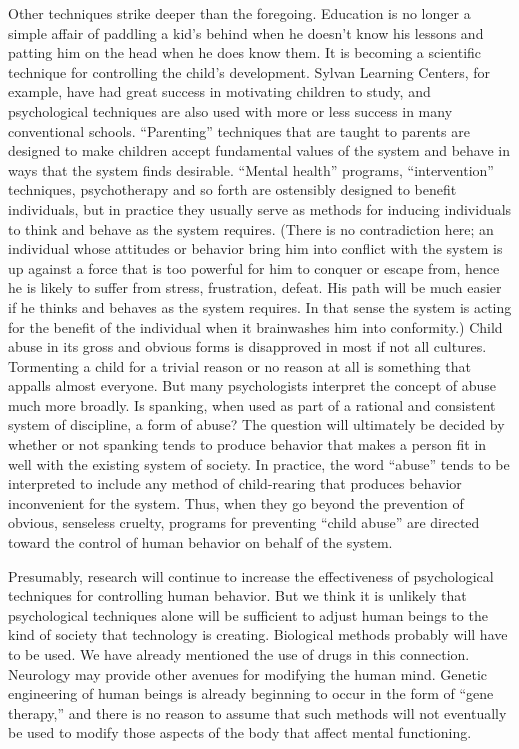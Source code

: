  Other techniques strike deeper than the foregoing. Education is no longer a simple affair of paddling a kid’s behind when he doesn’t know his lessons and patting him on the head when he does know them. It is becoming a scientific technique for controlling the child’s development. Sylvan Learning Centers, for example, have had great success in motivating children to study, and psychological techniques are also used with more or less success in many conventional schools. “Parenting” techniques that are taught to parents are designed to make children accept fundamental values of the system and behave in ways that the system finds desirable. “Mental health” programs, “intervention” techniques, psychotherapy and so forth are ostensibly designed to benefit individuals, but in practice they usually serve as methods for inducing individuals to think and behave as the system requires. (There is no contradiction here; an individual whose attitudes or behavior bring him into conflict with the system is up against a force that is too powerful for him to conquer or escape from, hence he is likely to suffer from stress, frustration, defeat. His path will be much easier if he thinks and behaves as the system requires. In that sense the system is acting for the benefit of the individual when it brainwashes him into conformity.) Child abuse in its gross and obvious forms is disapproved in most if not all cultures. Tormenting a child for a trivial reason or no reason at all is something that appalls almost everyone. But many psychologists interpret the concept of abuse much more broadly. Is spanking, when used as part of a rational and consistent system of discipline, a form of abuse? The question will ultimately be decided by whether or not spanking tends to produce behavior that makes a person fit in well with the existing system of society. In practice, the word “abuse” tends to be interpreted to include any method of child-rearing that produces behavior inconvenient for the system. Thus, when they go beyond the prevention of obvious, senseless cruelty, programs for preventing “child abuse” are directed toward the control of human behavior on behalf of the system.

 Presumably, research will continue to increase the effectiveness of psychological techniques for controlling human behavior. But we think it is unlikely that psychological techniques alone will be sufficient to adjust human beings to the kind of society that technology is creating. Biological methods probably will have to be used. We have already mentioned the use of drugs in this connection. Neurology may provide other avenues for modifying the human mind. Genetic engineering of human beings is already beginning to occur in the form of “gene therapy,” and there is no reason to assume that such methods will not eventually be used to modify those aspects of the body that affect mental functioning.

